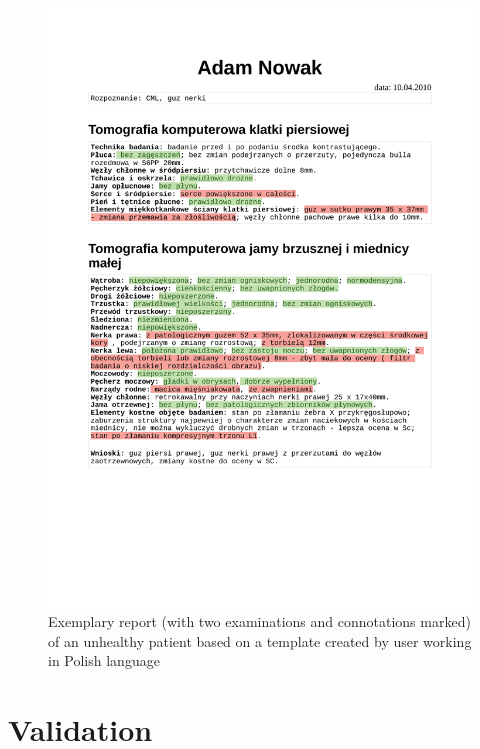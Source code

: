 \documentclass[12pt, twoside, openany]{report}
\theoremstyle{definition}
\begin{document}
\begin{figure}
	\centering
	\includegraphics[width=\linewidth, trim={0 7cm 0cm 2.5cm},clip]{rendered-report-pl-bad}
	\caption{
		Exemplary report (with two examinations and connotations marked) of an unhealthy patient based on a template created by user working in Polish language
		\label{fig:rendered-report-pl-bad}
	}
\end{figure}


\section{Validation}
\end{document}
